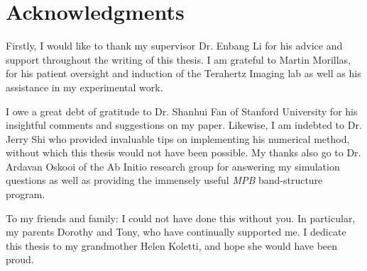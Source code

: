 \chapter*{Acknowledgments}
Firstly, I would like to thank my supervisor Dr. Enbang Li for his advice and support throughout the writing of this thesis. I am grateful to Martin Morillas, for his patient oversight and induction of the Terahertz Imaging lab as well as his assistance in my experimental work.

I owe a great debt of gratitude to Dr. Shanhui Fan of Stanford University for his insightful comments and suggestions on my paper. Likewise, I am indebted to Dr. Jerry Shi who provided invaluable tips on implementing his numerical method, without which this thesis would not have been possible. My thanks also go to Dr. Ardavan Oskooi of the Ab Initio research group for answering my simulation questions as well as providing the immensely useful \textit{MPB} band-structure program.

To my friends and family: I could not have done this without you. In particular, my parents Dorothy and Tony, who have continually supported me. I dedicate this thesis to my grandmother Helen Koletti, and hope she would have been proud.